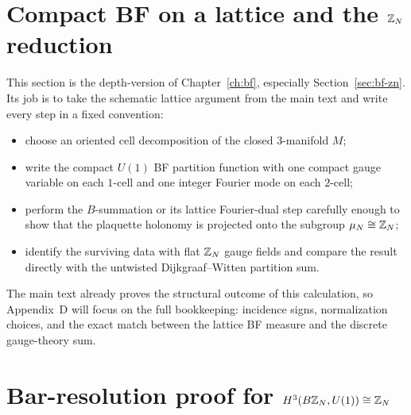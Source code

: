 \section{Compact BF on a lattice and the \texorpdfstring{$\mathbb{Z}_N$}{Z\_N} reduction}\label{sec:appD-bf-lattice}

This section is the depth-version of Chapter~\ref{ch:bf}, especially Section~\ref{sec:bf-zn}. Its job is to take the schematic lattice argument from the main text and write every step in a fixed convention:
\begin{itemize}
\item choose an oriented cell decomposition of the closed $3$-manifold $M$;
\item write the compact $U(1)$ BF partition function with one compact gauge variable on each $1$-cell and one integer Fourier mode on each $2$-cell;
\item perform the $B$-summation or its lattice Fourier-dual step carefully enough to show that the plaquette holonomy is projected onto the subgroup $\mu_N\cong \mathbb{Z}_N$;
\item identify the surviving data with flat $\mathbb{Z}_N$ gauge fields and compare the result directly with the untwisted Dijkgraaf--Witten partition sum.
\end{itemize}
The main text already proves the structural outcome of this calculation, so Appendix~D will focus on the full bookkeeping: incidence signs, normalization choices, and the exact match between the lattice BF measure and the discrete gauge-theory sum.

\section{Bar-resolution proof for \texorpdfstring{$H^3(B\mathbb{Z}_N,U(1))\cong \mathbb{Z}_N$}{H3(BZ\_N,U(1))}}\label{sec:appD-bar-resolution}


